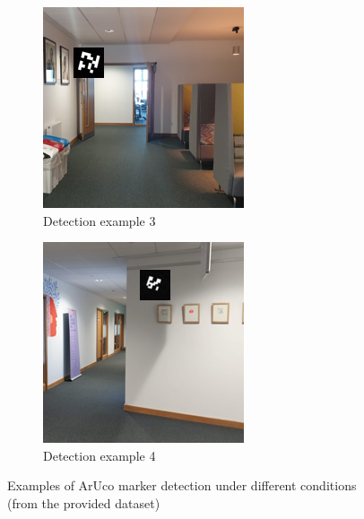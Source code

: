 \documentclass[conference]{IEEEtran}
\begin{document}
\begin{figure}[h]
  \vspace{0.5cm}
  
  \begin{subfigure}[b]{0.2\textwidth}
      \centering
      \includegraphics[width=\textwidth]{images/aruco-file3-detection-3.png}
      \caption{Detection example 3}
      \label{fig:det_ex3}
  \end{subfigure}
  \hfill
  \begin{subfigure}[b]{0.2\textwidth}
      \centering
      \includegraphics[width=\textwidth]{images/aruco-file3-detection-4.png}
      \caption{Detection example 4}
      \label{fig:det_ex4}
  \end{subfigure}
  \caption{Examples of ArUco marker detection under different conditions (from the provided dataset)}
  \label{fig:detection_examples}
\end{figure}
\end{document}

